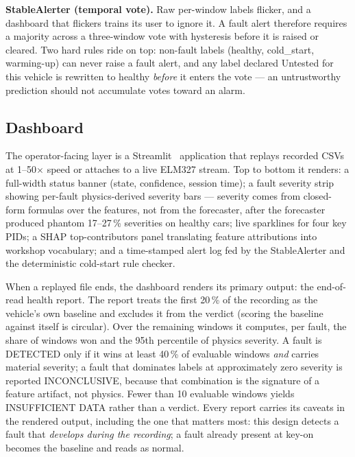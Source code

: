 \textbf{StableAlerter (temporal vote).} Raw per-window labels flicker, and
a dashboard that flickers trains its user to ignore it. A fault alert
therefore requires a majority across a three-window vote with hysteresis
before it is raised or cleared. Two hard rules ride on top: non-fault
labels (healthy, cold\_start, warming-up) can never raise a fault alert,
and any label declared Untested for this vehicle is rewritten to healthy
\emph{before} it enters the vote --- an untrustworthy prediction should not
accumulate votes toward an alarm.

\subsection{Dashboard}
\label{sec:dashboard}

The operator-facing layer is a Streamlit~\cite{streamlit} application that
replays recorded CSVs at 1--50$\times$ speed or attaches to a live ELM327
stream. Top to bottom it renders: a full-width status banner (state,
confidence, session time); a fault severity strip showing per-fault
physics-derived severity bars --- severity comes from closed-form formulas
over the features, not from the forecaster, after the forecaster produced
phantom 17--27\,\% severities on healthy cars; live sparklines for four key
PIDs; a SHAP top-contributors panel translating feature attributions into
workshop vocabulary; and a time-stamped alert log fed by the StableAlerter
and the deterministic cold-start rule checker.

When a replayed file ends, the dashboard renders its primary output: the
end-of-read health report. The report treats the first 20\,\% of the
recording as the vehicle's own baseline and excludes it from the verdict
(scoring the baseline against itself is circular). Over the remaining
windows it computes, per fault, the share of windows won and the 95th
percentile of physics severity. A fault is DETECTED only if it wins at
least 40\,\% of evaluable windows \emph{and} carries material severity; a
fault that dominates labels at approximately zero severity is reported
INCONCLUSIVE, because that combination is the signature of a feature
artifact, not physics. Fewer than 10 evaluable windows yields INSUFFICIENT
DATA rather than a verdict. Every report carries its caveats in the
rendered output, including the one that matters most: this design detects a
fault that \emph{develops during the recording}; a fault already present at
key-on becomes the baseline and reads as normal.

